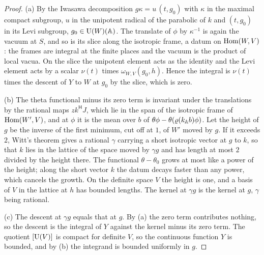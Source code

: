 \begin{proof}
(a) By the Iwasawa decomposition $g\kappa=u\,(t,g_0)$ with $\kappa$ in the maximal compact subgroup, $u$ in the unipotent radical of the parabolic of $k$ and $(t,g_0)$ in its Levi subgroup, $g_0\in\operatorname{U}(W)(\mathbb{A})$. The
translate of $\phi$ by $\kappa^{-1}$ is again the vacuum at $S$, and so is its slice along the isotropic frame, a datum on $\operatorname{Hom}(W,V)$: the frames are integral at the finite places and the vacuum is the product of local
vacua. On the slice the unipotent element acts as the identity and the Levi element acts by a scalar $\nu(t)$ times $\omega_{W,V}(g_0,h)$. Hence the integral is $\nu(t)$ times the descent of $Y$ to $W$ at $g_0$ by the slice, which
is zero.

(b) The theta functional minus its zero term is invariant under the translations by the rational maps $zk^{\mathsf H}J$, which lie in the span of the isotropic frame of $\operatorname{Hom}(W',V)$, and at $\phi$ it is the mean over $b$ of
$\theta\phi-\theta(\varrho(k_{\mathbb{A}}b)\phi)$. Let the height of $g$ be the inverse of the first minimum, cut off at $1$, of $W'$ moved by $g$. If it exceeds $2$, Witt's theorem gives a rational $\gamma$ carrying a short isotropic
vector at $g$ to $k$, so that $k$ lies in the lattice of the space moved by $\gamma g$ and has length at most $2$ divided by the height there. The functional $\theta-\theta_0$ grows at most like a power of the height; along the
short vector $k$ the datum decays faster than any power, which cancels the growth. On the definite space $V$ the height is one, and a basis of $V$ in the lattice at $h$ has bounded lengths. The kernel at $\gamma g$ is the
kernel at $g$, $\gamma$ being rational.

(c) The descent at $\gamma g$ equals that at $g$. By (a) the zero term contributes nothing, so the descent is the integral of $Y$ against the kernel minus its zero term. The quotient $[\operatorname{U}(V)]$ is compact for definite $V$, so
the continuous function $Y$ is bounded, and by (b) the integrand is bounded uniformly in $g$.
\end{proof}

